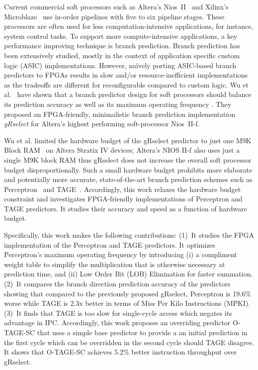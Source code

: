 \documentclass[conference]{IEEEtran}
\begin{document}
Current commercial soft processors such as Altera's Nios~II~\cite{niosii} and Xilinx's Microblaze~\cite{microblaze} use in-order pipelines with five to six pipeline stages. These processors are often used for less computation-intensive applications, for instance, system control tasks. To support more compute-intensive applications, a key performance improving technique is branch prediction. Branch prediction has been extensively studied, mostly in the context of application specific custom logic (ASIC) implementations. However, na\"ively porting ASIC-based branch predictors to FPGAs results in slow and/or resource-inefficient implementations as the tradeoffs are different for reconfigurable compared to custom logic. Wu et al.~ have shown that a branch predictor design for soft processors should balance its prediction accuracy as well as its maximum operating frequency \cite{grselect}. They proposed an FPGA-friendly, minimalistic branch prediction implementation \textit{gRselect} for Altera's highest performing soft-processor Nios~II-f.

Wu et al. limited the hardware budget of the gRselect predictor to just one M9K Block RAM~\cite{StratixIVM9K} on Altera Stratix IV devices; Altera's NIOS II-f also uses just a single M9K block RAM thus gRselect does not increase the overall soft processor budget disproportionally. Such a small hardware budget prohibits more elaborate and potentially more accurate, state-of-the-art branch prediction schemes such as  Perceptron~\cite{perceptron} and TAGE~\cite{tage}. Accordingly, this work relaxes the hardware budget constraint and investigates FPGA-friendly implementations of Perceptron and TAGE predictors. It studies their accuracy and speed as a function of hardware budget.  

Specifically, this work makes the following contributions: (1)~It studies the FPGA implementation of the Perceptron and TAGE predictors. It optimizes Perceptron's maximum operating frequency  by introducing (i) a compliment weight table to simplify the multiplication that is otherwise necessary at  prediction time, and (ii) Low Order Bit (LOB) Elimination for faster summation. (2)~It compares the branch direction prediction accuracy of the predictors showing that compared to the previously proposed gRselect, Perceptron is 19.6\% worse while TAGE is 2.3x better in terms of Miss Per Kilo Instructions (MPKI). (3)~It finds that TAGE is too slow for single-cycle access which negates its advantage in IPC. Accordingly, this work proposes an overriding predictor \mbox{O-TAGE-SC} that uses a simple base predictor to provide a an initial prediction in the first cycle which can be overridden in the second cycle should TAGE disagree. It shows that \mbox{O-TAGE-SC} achieves 5.2\% better instruction throughput over gRselect.
\end{document}
